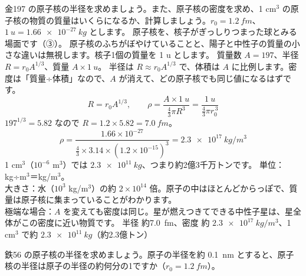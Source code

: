 \label{ph:原-11:ex1}
\begin{phreidai}[原子核の密度]
金197 の原子核の半径を求めましょう。また、原子核の密度を求め、1 cm$^3$ の原子核の物質の質量はいくらになるか、計算しましょう。$r_0=\qty{1.2}{fm}$、$\qty{1}{u}=\qty{1.66e-27}{kg}$ とします。
\phbamen
原子核を、核子がぎっしりつまった球とみる場面です（③）。
\phmushi
原子核のふちがぼやけていることと、陽子と中性子の質量の小さな違いは無視します。核子1個の質量を 1 u とします。
\phzu
質量数 $A=197$、半径 $R=r_0A^{1/3}$、質量 $A\times\qty{1}{u}$。
\phriyu
半径は $R\approx r_0A^{1/3}$ で、体積は $A$ に比例します。密度は「質量÷体積」なので、$A$ が消えて、どの原子核でも同じ値になるはずです。
\phtateru
\[ R=r_0A^{1/3},\qquad\rho=\frac{A\times\qty{1}{u}}{\tfrac43\pi R^3}=\frac{\qty{1}{u}}{\tfrac43\pi r_0^{\,3}} \]
\phtoku
$197^{1/3}=5.82$ なので $R=1.2\times5.82=\qty{7.0}{fm}$。
\[ \rho=\frac{1.66\times10^{-27}}{\tfrac43\times3.14\times(1.2\times10^{-15})^3}=\qty{2.3e17}{kg/m^3} \]
1 cm$^3$（$10^{-6}$ m$^3$）では $\qty{2.3e11}{kg}$、つまり約2億3千万トンです。
\phtashikame
単位：kg÷m$^3$＝kg/m$^3$。\\
大きさ：水（$10^3$ kg/m$^3$）の約 $2\times10^{14}$ 倍。原子の中はほとんどからっぽで、質量は原子核に集まっていることがわかります。\\
極端な場合：$A$ を変えても密度は同じ。星が燃えつきてできる中性子星は、星全体がこの密度に近い物質です。
\kotae 半径 約\qty{7.0}{fm}、密度 約 $\qty{2.3e17}{kg/m^3}$、1 cm$^3$ で約 $\qty{2.3e11}{kg}$（約2.3億トン）
\end{phreidai}
\begin{jibun}
鉄56 の原子核の半径を求めましょう。原子の半径を約 \qty{0.1}{nm} とすると、原子核の半径は原子の半径の約何分の1ですか（$r_0=\qty{1.2}{fm}$）。
\end{jibun}

